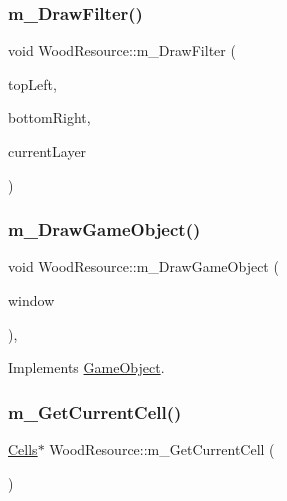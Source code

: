 \subsubsection{\texorpdfstring{m\+\_\+\+Draw\+Filter()}{m\_DrawFilter()}\hspace{0.1cm}{\footnotesize\ttfamily [2/2]}}
{\footnotesize\ttfamily void Wood\+Resource\+::m\+\_\+\+Draw\+Filter (\begin{DoxyParamCaption}\item[{sf\+::\+Vector2f}]{top\+Left,  }\item[{sf\+::\+Vector2f}]{bottom\+Right,  }\item[{int}]{current\+Layer }\end{DoxyParamCaption})}

\mbox{\label{class_wood_resource_a8f2336619be4467ba0eba87ded7b7474}} 
\subsubsection{\texorpdfstring{m\+\_\+\+Draw\+Game\+Object()}{m\_DrawGameObject()}}
{\footnotesize\ttfamily void Wood\+Resource\+::m\+\_\+\+Draw\+Game\+Object (\begin{DoxyParamCaption}\item[{sf\+::\+Render\+Window \&}]{window }\end{DoxyParamCaption})\hspace{0.3cm}{\ttfamily [override]}, {\ttfamily [virtual]}}



Implements \mbox{\hyperlink{class_game_object_a184ac59fd5167c55a54b50894e5b6721}{Game\+Object}}.

\mbox{\label{class_wood_resource_a9c7446775e6e37e60a0bfce147d8151f}} 
\subsubsection{\texorpdfstring{m\+\_\+\+Get\+Current\+Cell()}{m\_GetCurrentCell()}}
{\footnotesize\ttfamily \mbox{\hyperlink{class_cells}{Cells}}$\ast$ Wood\+Resource\+::m\+\_\+\+Get\+Current\+Cell (\begin{DoxyParamCaption}{ }\end{DoxyParamCaption})}

